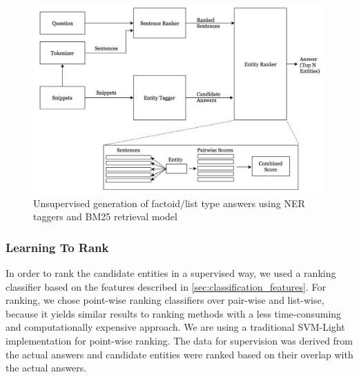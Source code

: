 \documentclass[11pt,a4paper]{article}
\begin{document}
\begin{figure}
    \centering
    \includegraphics[scale=0.4]{UnsupervisedNERPipeline.png}
    \caption{Unsupervised generation of factoid/list type answers using NER taggers and BM25 retrieval model}
    \label{fig:UnsupervisedNERPipeline}
\end{figure}

\subsubsection{Learning To Rank}

In order to rank the candidate entities in a supervised way, we used a ranking classifier based on the features described in \ref{sec:classification_features}. For ranking, we chose point-wise ranking classifiers over pair-wise and list-wise, because it yields similar results to ranking methods with a less time-consuming and computationally expensive approach. We are using a traditional SVM-Light \cite{svmlight} implementation for point-wise ranking. The data for supervision was derived from the actual answers and candidate entities were ranked based on their overlap with the actual answers. 


\end{document}
